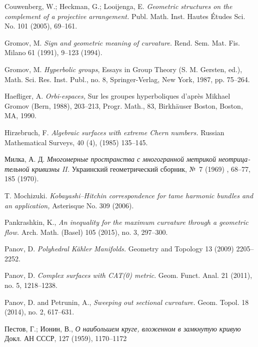 \documentclass{compositio}
\begin{document}
\begin{thebibliography}{52}
 Couwenberg, W.; Heckman, G.; Looijenga, E.
\textit{Geometric structures on the complement of a projective arrangement.}
Publ. Math. Inst. Hautes \'Etudes Sci. No. 101 (2005), 69--161.

 Gromov, M. 
\textit{Sign and geometric meaning of curvature.} 
Rend. Sem. Mat. Fis. Milano 61 (1991), 9--123 (1994). 

 Gromov, M. 
\textit{Hyperbolic groups}, 
Essays in Group Theory (S. M. Gersten, ed.), Math. Sci.
Res. Inst. Publ., no. 8, Springer-Verlag, New York, 1987, pp. 75--264.

Haefliger, A.
\textit{Orbi-espaces,} 
Sur les groupes hyperboliques d'apr\`{e}s Mikhael Gromov (Bern, 1988), 203--213,
Progr. Math., 83, Birk\-h\"auser Boston, Boston, MA, 1990.

 Hirzebruch, F. 
\textit{Algebraic surfaces with extreme Chern numbers.}
Russian Mathematical Surveys, 40 (4), (1985) 135--145.

\begin{otherlanguage}{russian}
Милка, А. Д.
\textit{Многомерные пространства с многогранной метрикой неотрицательной кривизны II.}
Украинский геометрический сборник, №~7 (1969) , 68--77, 185 (1970). 
\end{otherlanguage}


 T. Mochizuki. \textit{Kobayashi--Hitchin correspondence for tame
harmonic bundles and an application,} 
Asterisque No. 309
(2006).

 Pankrashkin, K., 
\textit{An inequality for the maximum curvature through a geometric flow.} Arch. Math. (Basel) 105 (2015), no. 3, 297--300.


 Panov, D.  \textit{Polyhedral K\"ahler Manifolds.}
Geometry and Topology 13 (2009) 2205--2252.

 Panov, D. \textit{Complex surfaces with {\rm CAT(0)} metric}.
Geom. Funct. Anal. 21 (2011), no. 5, 1218--1238.

 Panov, D. and Petrunin, A., \textit{Sweeping out sectional curvature.}  Geom. Topol. 18 (2014), no. 2, 617--631.

\begin{otherlanguage}{russian}
Пестов, Г.; Ионин, В.,
\textit{О наибольшем круге, вложенном в замкнутую кривую}
Докл. АН СССР, 127 (1959), 1170--1172
\end{otherlanguage}



\end{thebibliography}
\end{document}
